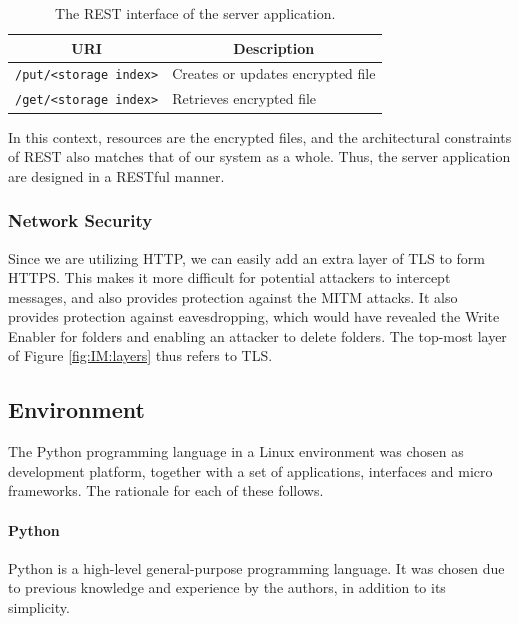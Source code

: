 \documentclass[pdftex,english,10pt,b5paper,twoside]{book}
\begin{document}
\begin{table}[h!]
    \centering
    \caption{The \acs{REST} interface of the server application.}
    \begin{tabular}{|l|l|}
        \hline
        \multicolumn{1}{|c}{\textbf{\acs{URI}}} & \multicolumn{1}{|c|}{\textbf{Description}} \\
        \hline
        \texttt{/put/<storage index>} & Creates or updates encrypted file \\
        \hline
        \texttt{/get/<storage index>} & Retrieves encrypted file \\
        \hline
    \end{tabular}
    \label{tbl:IM:restinterface}
\end{table}

In this context, resources are the encrypted files, and the architectural
constraints of \ac{REST} also matches that of our system as a
whole. Thus, the server application are designed in a \acs{REST}ful manner.

\subsubsection{Network Security} Since we are utilizing \ac{HTTP}, we can
easily add an extra layer of \ac{TLS} to form \ac{HTTPS}. This makes it more
difficult for potential attackers to intercept messages, and also provides
protection against the \ac{MITM} attacks. It also provides protection against
eavesdropping, which would have revealed the Write Enabler for folders and
enabling an attacker to delete folders. The top-most layer of Figure
\ref{fig:IM:layers} thus refers to \ac{TLS}.

\subsection{Environment}

The Python programming language in a Linux environment was chosen as development
platform, together with a set of applications, interfaces and micro frameworks.
The rationale for each of these follows.

\paragraph{Python} Python is a high-level general-purpose programming language.
It was chosen due to previous knowledge and experience by the
authors, in addition to its simplicity.
\end{document}
